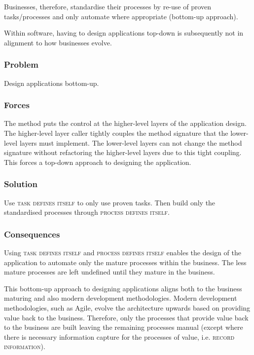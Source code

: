 \documentclass[prodmode]{style/acmlarge}
\begin{document}
Businesses, therefore, standardise their processes by re-use of proven
tasks/processes and only automate where appropriate (bottom-up approach).

Within software, having to design applications top-down is subsequently
not in alignment to how businesses evolve.

\subsubsection*{\textbf{Problem}} Design applications bottom-up.

\subsubsection*{Forces} The method puts the control at the higher-level layers
of the application design.  The higher-level layer caller tightly couples the
method signature that the lower-level layers must implement.  The lower-level
layers can not change the method signature without refactoring the higher-level
layers due to this tight coupling.  This forces a top-down approach to designing
the application.

\subsubsection*{\textbf{Solution}} Use \textsc{task defines itself} to only use proven
tasks.  Then build only the standardised processes through \textsc{process
defines itself}.

\subsubsection*{Consequences} Using \textsc{task defines itself} and
\textsc{process defines itself} enables the design of the application to
automate only the mature processes within the business.  The less mature
processes are left undefined until they mature in the business.

This bottom-up approach to designing applications aligns both to the business
maturing and also modern development methodologies.  Modern development
methodologies, such as Agile, evolve the architecture upwards based on providing
value back to the business.  Therefore, only the processes that provide value
back to the business are built leaving the remaining processes manual (except
where there is necessary information capture for the processes of value, i.e.
\textsc{record information}).
\end{document}
